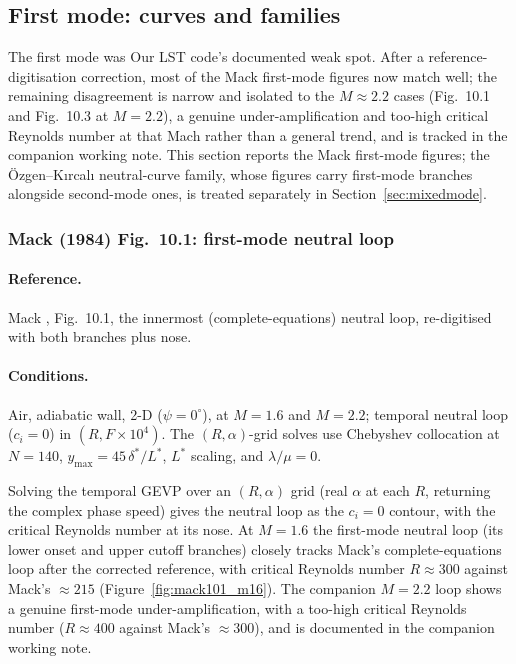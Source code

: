 \documentclass[11pt]{article}
\begin{document}
\FloatBarrier
\subsection{First mode: curves and families}
\label{sec:firstmode}
The first mode was Our LST code's documented weak spot. After a reference-digitisation
correction, most of the Mack first-mode figures now match well; the remaining disagreement is
narrow and isolated to the $M\approx2.2$ cases (Fig.~10.1 and Fig.~10.3 at $M=2.2$), a genuine
under-amplification and too-high critical Reynolds number at that Mach rather than a general trend,
and is tracked in the companion working note. This section reports the Mack first-mode figures;
the \"Ozgen--K{\i}rcal{\i} neutral-curve family, whose figures carry first-mode branches alongside
second-mode ones, is treated separately in Section~\ref{sec:mixedmode}.

\subsubsection{Mack (1984) Fig.~10.1: first-mode neutral loop}
\label{sec:mack101}

\paragraph{Reference.} Mack \cite{mack1984}, Fig.~10.1, the innermost (complete-equations) neutral
loop, re-digitised with both branches plus nose.

\paragraph{Conditions.} Air, adiabatic wall, 2-D ($\psi=0^\circ$), at $M=1.6$ and $M=2.2$;
temporal neutral loop ($c_i=0$) in $(R, F\!\times\!10^4)$. The $(R,\alpha)$-grid solves use Chebyshev
collocation at $N=140$, $y_{\max}=45\,\delta^\ast/L^\ast$, $L^\ast$ scaling, and $\lambda/\mu=0$.

Solving the temporal GEVP over an $(R,\alpha)$ grid (real $\alpha$ at each $R$, returning the
complex phase speed) gives the neutral loop as the $c_i=0$ contour, with the critical Reynolds
number at its nose. At $M=1.6$ the first-mode neutral loop (its lower onset and upper cutoff
branches) closely tracks Mack's complete-equations loop after the corrected reference, with critical
Reynolds number $R\approx300$ against Mack's $\approx215$
(Figure~\ref{fig:mack101_m16}). The companion $M=2.2$ loop shows a genuine first-mode
under-amplification, with a too-high critical Reynolds number ($R\approx400$ against Mack's
$\approx300$), and is documented in the companion working note.
\end{document}
